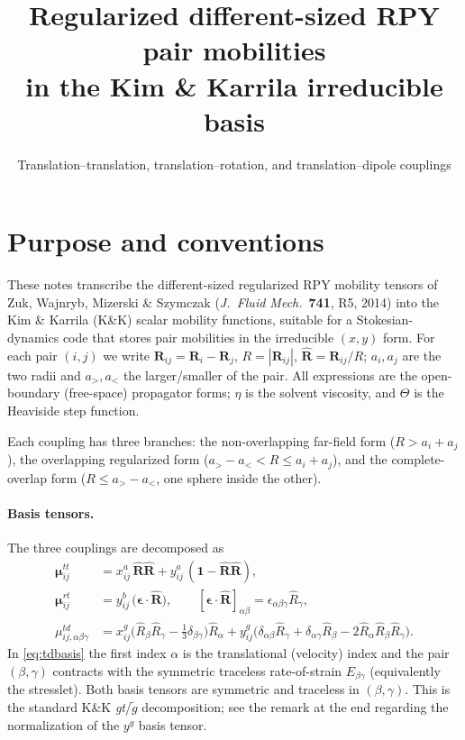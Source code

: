 \documentclass[11pt]{article}
\title{\vspace{-2em}Regularized different-sized RPY pair mobilities\\
in the Kim \& Karrila irreducible basis}
\author{Translation--translation, translation--rotation, and translation--dipole couplings}
\date{}
\newcommand{\Rh}{\hat{\mathbf{R}}}
\newcommand{\Rhh}[1]{\hat{R}_{#1}}
\newcommand{\one}{\mathbf{1}}
\newcommand{\eps}{\bm{\epsilon}}
\newcommand{\third}{\tfrac{1}{3}}
\begin{document}
\maketitle
\vspace{-2.5em}

\section*{Purpose and conventions}

These notes transcribe the different-sized regularized RPY mobility tensors of
Zuk, Wajnryb, Mizerski \& Szymczak (\emph{J.\ Fluid Mech.}\ \textbf{741}, R5, 2014) into
the Kim \& Karrila (K\&K) scalar mobility functions, suitable for a Stokesian-dynamics
code that stores pair mobilities in the irreducible $(x,y)$ form.  For each pair $(i,j)$ we
write $\mathbf{R}_{ij}=\mathbf{R}_i-\mathbf{R}_j$, $R=|\mathbf{R}_{ij}|$,
$\Rh=\mathbf{R}_{ij}/R$; $a_i,a_j$ are the two radii and $a_>,a_<$ the larger/smaller of the
pair.  All expressions are the open-boundary (free-space) propagator forms; $\eta$ is the
solvent viscosity, and $\Theta$ is the Heaviside step function.

Each coupling has three branches: the non-overlapping far-field form
($R>a_i+a_j$), the overlapping regularized form ($a_>-a_<<R\le a_i+a_j$), and the
complete-overlap form ($R\le a_>-a_<$, one sphere inside the other).

\paragraph{Basis tensors.}
The three couplings are decomposed as
\begin{align}
\bm{\mu}^{tt}_{ij} &= x^a_{ij}\,\Rh\Rh + y^a_{ij}\,(\one-\Rh\Rh),\\[2pt]
\bm{\mu}^{rt}_{ij} &= y^b_{ij}\,\big(\eps\cdot\Rh\big),
\qquad [\eps\cdot\Rh]_{\alpha\beta}=\epsilon_{\alpha\beta\gamma}\Rhh{\gamma},\\[2pt]
\mu^{td}_{ij,\alpha\beta\gamma} &=
x^g_{ij}\Big(\Rhh{\beta}\Rhh{\gamma}-\third\delta_{\beta\gamma}\Big)\Rhh{\alpha}
+ y^g_{ij}\Big(\delta_{\alpha\beta}\Rhh{\gamma}+\delta_{\alpha\gamma}\Rhh{\beta}
-2\Rhh{\alpha}\Rhh{\beta}\Rhh{\gamma}\Big).
\label{eq:tdbasis}
\end{align}
In \eqref{eq:tdbasis} the first index $\alpha$ is the translational (velocity) index and the
pair $(\beta,\gamma)$ contracts with the symmetric traceless rate-of-strain $E_{\beta\gamma}$
(equivalently the stresslet).  Both basis tensors are symmetric and traceless in
$(\beta,\gamma)$.  This is the standard K\&K \emph{gt}/$\tilde{g}$ decomposition; see the
remark at the end regarding the normalization of the $y^g$ basis tensor.
\end{document}

